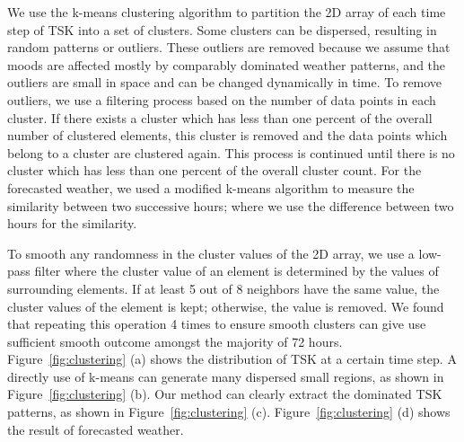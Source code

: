 We use the k-means clustering algorithm to partition the 2D array of each time step of TSK into a set of clusters. Some clusters can be dispersed, resulting in random patterns or outliers. These outliers are removed because we assume that moods are affected mostly by comparably dominated weather patterns, and the outliers are small in space and can be changed dynamically in time. To remove outliers, we use a filtering process based on the number of data points in each cluster. If there exists a cluster which has less than one percent of the overall number of clustered elements, this cluster is removed and the data points which belong to a cluster are clustered again. This process is continued until there is no cluster which has less than one percent of the overall cluster count. For the forecasted weather, we used a modified k-means algorithm to measure the similarity between two successive hours; where we use the difference between two hours for the similarity.

%


To smooth any randomness in the cluster values of the 2D array, we use a low-pass filter where the cluster value of an element is determined by the values of surrounding elements.
If at least 5 out of 8 neighbors have the same value, the cluster values of the element is kept; otherwise, the value is removed. We found that repeating this operation 4 times to ensure smooth clusters can give use sufficient smooth outcome amongst the majority of 72 hours.
Figure~\ref{fig:clustering} (a) shows the distribution of TSK at a certain time step. A directly use of k-means can generate many dispersed small regions, as shown in Figure~\ref{fig:clustering} (b). Our method can clearly extract the dominated TSK patterns, as shown in Figure~\ref{fig:clustering} (c). Figure~\ref{fig:clustering} (d) shows the result of forecasted weather.

